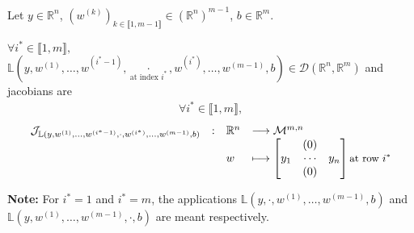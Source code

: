 \documentclass[11pt,en]{elegantpaper}
\newcommand{\Real}{\mathbb{R}}
\begin{document}
\begin{proposition}
  {\normalfont
    Let $y \in \Real^n$, $(w^{(k)})_{k \in \llbracket 1,m-1 \rrbracket} \in (\Real^n)^{m-1}$, $b \in \Real^m$. \par
    $\forall i^* \in \llbracket 1,m \rrbracket,$
    $\mathbb{L}(y,w^{(1)},\ldots,w^{(i^*-1)},\underset{\text{at index $i^*$}}{\cdot},w^{(i^*)},\ldots,w^{(m-1)},b) \in \mathcal{D}(\Real^n, \Real^m)$
    and jacobians are \begin{equation*}
      \begin{gathered}
        \forall i^* \in \llbracket 1,m \rrbracket,
      \end{gathered}
    \end{equation*}
    \begin{equation}\label{prop:densel_W_differential}
      \begin{array}{llll}
        \mathcal{J}_{\mathbb{L}(y,w^{(1)},\ldots,w^{(i^*-1)},\cdot,w^{(i^*)},\ldots,w^{(m-1)},b)} & : & \Real^n  & \longrightarrow \mathcal{M}^{m,n} \\
        &   & w & \longmapsto \begin{bmatrix}
          & (0) & \\
          y_1 & \cdots & y_n \\
          & (0) &
        \end{bmatrix} \text{\small{at row $i^*$}}
      \end{array}
    \end{equation} \par
    \textbf{Note:} For $i^*=1$ and $i^*=m$,
    the applications $\mathbb{L}(y,\cdot,w^{(1)},\ldots,w^{(m-1)},b)$ and $\mathbb{L}(y,w^{(1)},\ldots,w^{(m-1)},\cdot,b)$ are meant respectively.
  }
\end{proposition}
\end{document}
